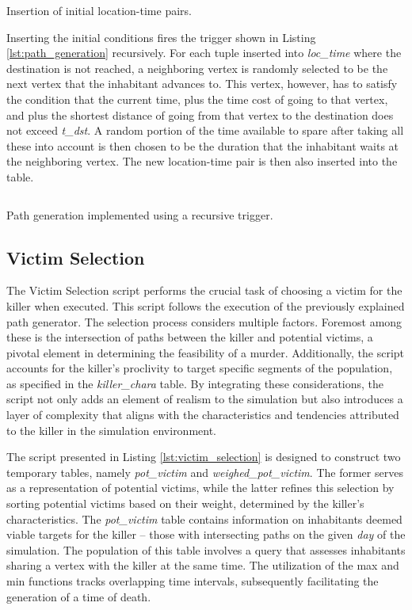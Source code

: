 \documentclass{article}
\begin{document}
\begin{listing}[H]
    \inputminted[firstline=3, lastline=9, breaklines=true]
    {sql}{query_loc_time.sql}
    \caption{Insertion of initial location-time pairs.}
    \label{lst:path_generation_init}
\end{listing}

Inserting the initial conditions fires the trigger shown in Listing \ref{lst:path_generation} recursively. For each tuple inserted into \textit{loc\_time} where the destination is not reached, a neighboring vertex is randomly selected to be the next vertex that the inhabitant advances to. This vertex, however, has to satisfy the condition that the current time, plus the time cost of going to that vertex, and plus the shortest distance of going from that vertex to the destination does not exceed \textit{t\_dst}. A random portion of the time available to spare after taking all these into account is then chosen to be the duration that the inhabitant waits at the neighboring vertex. The new location-time pair is then also inserted into the table.

\begin{listing}[H]
    \inputminted[firstline=42, lastline=63, breaklines=true]
    {sql}{init_loc_time.sql}
    \caption{Path generation implemented using a recursive trigger.}
    \label{lst:path_generation}
\end{listing}

\subsection{Victim Selection}
The Victim Selection script performs the crucial task of choosing a victim for the killer when executed. This script follows the execution of the previously explained path generator. The selection process considers multiple factors. Foremost among these is the intersection of paths between the killer and potential victims, a pivotal element in determining the feasibility of a murder. Additionally, the script accounts for the killer's proclivity to target specific segments of the population, as specified in the \textit{killer\_chara} table. By integrating these considerations, the script not only adds an element of realism to the simulation but also introduces a layer of complexity that aligns with the characteristics and tendencies attributed to the killer in the simulation environment.

The script presented in Listing \ref{lst:victim_selection} is designed to construct two temporary tables, namely \textit{pot\_victim} and \textit{weighed\_pot\_victim}. The former serves as a representation of potential victims, while the latter refines this selection by sorting potential victims based on their weight, determined by the killer's characteristics. The \textit{pot\_victim} table contains information on inhabitants deemed viable targets for the killer – those with intersecting paths on the given \textit{day} of the simulation. The population of this table involves a query that assesses inhabitants sharing a vertex with the killer at the same time. The utilization of the max and min functions tracks overlapping time intervals, subsequently facilitating the generation of a time of death.
\end{document}
